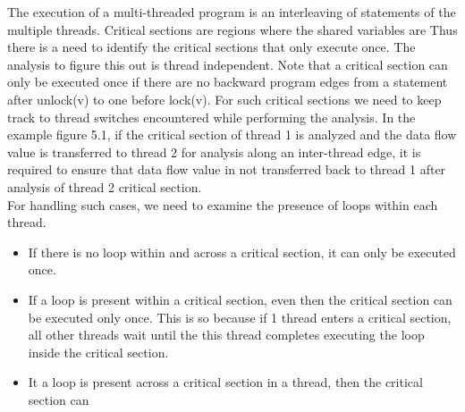 The execution of a multi-threaded program is an interleaving of statements of the multiple threads. Critical sections are regions where the shared variables are  Thus there is a need to identify the critical sections that only execute once. The analysis to figure this out is thread independent. Note that a critical section can only be executed once if there are no backward program edges from a statement after unlock(v) to one before lock(v). For such critical sections we need to keep track to thread switches encountered while performing the analysis. In the example figure 5.1, if the critical section of thread 1 is analyzed and the data flow value is transferred to thread 2 for analysis along an inter-thread edge, it is required to ensure that data flow value in not transferred back to thread 1 after analysis of thread 2 critical section. \\

For handling such cases, we need to examine the presence of loops within each thread. 
\begin{itemize}
	\item If there is no loop within and across a critical section, it can only be executed once.
	\item If a loop is present within a critical section, even then the critical section can be executed only once. This is so because if 1 thread enters a critical section, all other threads wait until the this thread completes executing the loop inside the critical section.
	\item It a loop is present across a critical section in a thread, then the critical section can 
\end{itemize}
          